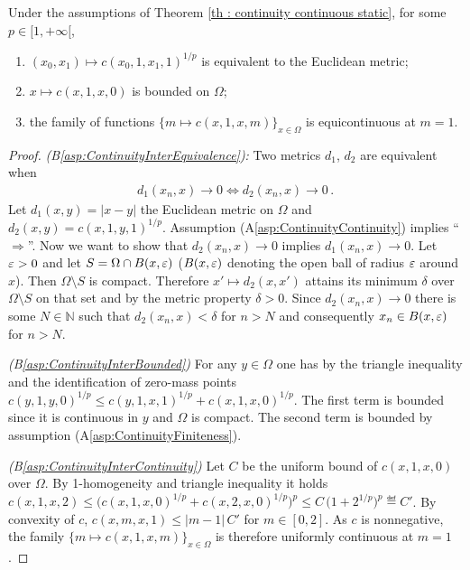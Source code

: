 %
\begin{lemma}
	\label{lemma: continuity aux lemma}
	Under the assumptions of Theorem \ref{th : continuity continuous static}, for some $p\in [1,+\infty[$,
	\begin{enumerate}[{(B}1{)}]
		\item $(x_0,x_1) \mapsto c(x_0,1,x_1,1)^{1/p}$ is equivalent to the Euclidean metric; \label{asp:ContinuityInterEquivalence}
		\item $x \mapsto c(x,1,x,0)$ is bounded on $\Omega$;
		\label{asp:ContinuityInterBounded}
		\item the family of functions $\{m \mapsto c(x,1,x,m)\}_{x \in \Omega}$ is  equicontinuous at $m=1$. \label{asp:ContinuityInterContinuity}
	\end{enumerate}
\end{lemma}
\begin{proof} \textit{(B\ref{asp:ContinuityInterEquivalence}):}
	Two metrics $d_1$, $d_2$ are equivalent when
	\begin{align*}
		d_1(x_n,x) \rightarrow 0 \Leftrightarrow d_2(x_n,x) \rightarrow 0\,.
	\end{align*}
	Let $d_1(x,y) = |x-y|$ the Euclidean metric on $\Omega$ and $d_2(x,y) = c(x,1,y,1)^{1/p}$. Assumption (A\ref{asp:ContinuityContinuity}) implies ``$\Rightarrow$''.
	Now we want to show that $d_2(x_n,x) \rightarrow 0$ implies $d_1(x_n,x) \rightarrow 0$. Let $\varepsilon > 0$ and let $S = \Omega \cap B(x,\varepsilon)$ ($B(x,\varepsilon)$ denoting the open ball of radius $\varepsilon$ around $x$). Then $\Omega \setminus S$ is compact. Therefore $x' \mapsto d_2(x,x')$ attains its minimum $\delta$ over $\Omega \setminus S$ on that set and by the metric property $\delta > 0$. Since $d_2(x_n,x) \rightarrow 0$ there is some $N \in \mathbb{N}$ such that $d_2(x_n,x) < \delta$ for $n>N$ and consequently $x_n \in B(x,\varepsilon)$ for $n>N$.
	
	\textit{(B\ref{asp:ContinuityInterBounded})} For any $y \in \Omega$ one has by the triangle inequality and the identification of zero-mass points $c(y,1,y,0)^{1/p} \leq c(y,1,x,1)^{1/p} + c(x,1,x,0)^{1/p}$. The first term is bounded since it is continuous in $y$ and $\Omega$ is compact. The second term is bounded by assumption (A\ref{asp:ContinuityFiniteness}).
	
	\textit{(B\ref{asp:ContinuityInterContinuity})} Let $C$ be the uniform bound of $c(x,1,x,0)$ over $\Omega$. By 1-homogeneity and triangle inequality it holds $c(x,1,x,2) \leq \big( c(x,1,x,0)^{1/p} + c(x,2,x,0)^{1/p} \big)^p \leq C\,\big( 1+ 2^{1/p} \big)^p \eqdef C'$. By convexity of $c$, $c(x,m,x,1) \leq |m-1|\,C'$ for $m \in [0,2]$. As $c$ is nonnegative, the family $\{m \mapsto c(x,1,x,m) \}_{x \in \Omega}$ is therefore uniformly continuous at $m=1$.
\end{proof}

